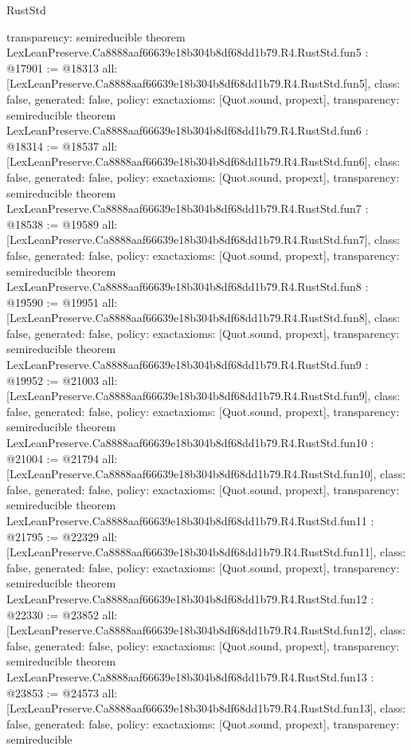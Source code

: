 \begin{lexlean}{RustStd}
\begin{coremodule}
{  transparency: semireducible
}
theorem LexLeanPreserve.Ca8888aaf66639e18b304b8df68dd1b79.R4.RustStd.fun5 : @17901 := @18313 {
  all: [LexLeanPreserve.Ca8888aaf66639e18b304b8df68dd1b79.R4.RustStd.fun5],
  class: false,
  generated: false,
  policy: exact{axioms: [Quot.sound, propext]},
  transparency: semireducible
}
theorem LexLeanPreserve.Ca8888aaf66639e18b304b8df68dd1b79.R4.RustStd.fun6 : @18314 := @18537 {
  all: [LexLeanPreserve.Ca8888aaf66639e18b304b8df68dd1b79.R4.RustStd.fun6],
  class: false,
  generated: false,
  policy: exact{axioms: [Quot.sound, propext]},
  transparency: semireducible
}
theorem LexLeanPreserve.Ca8888aaf66639e18b304b8df68dd1b79.R4.RustStd.fun7 : @18538 := @19589 {
  all: [LexLeanPreserve.Ca8888aaf66639e18b304b8df68dd1b79.R4.RustStd.fun7],
  class: false,
  generated: false,
  policy: exact{axioms: [Quot.sound, propext]},
  transparency: semireducible
}
theorem LexLeanPreserve.Ca8888aaf66639e18b304b8df68dd1b79.R4.RustStd.fun8 : @19590 := @19951 {
  all: [LexLeanPreserve.Ca8888aaf66639e18b304b8df68dd1b79.R4.RustStd.fun8],
  class: false,
  generated: false,
  policy: exact{axioms: [Quot.sound, propext]},
  transparency: semireducible
}
theorem LexLeanPreserve.Ca8888aaf66639e18b304b8df68dd1b79.R4.RustStd.fun9 : @19952 := @21003 {
  all: [LexLeanPreserve.Ca8888aaf66639e18b304b8df68dd1b79.R4.RustStd.fun9],
  class: false,
  generated: false,
  policy: exact{axioms: [Quot.sound, propext]},
  transparency: semireducible
}
theorem LexLeanPreserve.Ca8888aaf66639e18b304b8df68dd1b79.R4.RustStd.fun10 : @21004 := @21794 {
  all: [LexLeanPreserve.Ca8888aaf66639e18b304b8df68dd1b79.R4.RustStd.fun10],
  class: false,
  generated: false,
  policy: exact{axioms: [Quot.sound, propext]},
  transparency: semireducible
}
theorem LexLeanPreserve.Ca8888aaf66639e18b304b8df68dd1b79.R4.RustStd.fun11 : @21795 := @22329 {
  all: [LexLeanPreserve.Ca8888aaf66639e18b304b8df68dd1b79.R4.RustStd.fun11],
  class: false,
  generated: false,
  policy: exact{axioms: [Quot.sound, propext]},
  transparency: semireducible
}
theorem LexLeanPreserve.Ca8888aaf66639e18b304b8df68dd1b79.R4.RustStd.fun12 : @22330 := @23852 {
  all: [LexLeanPreserve.Ca8888aaf66639e18b304b8df68dd1b79.R4.RustStd.fun12],
  class: false,
  generated: false,
  policy: exact{axioms: [Quot.sound, propext]},
  transparency: semireducible
}
theorem LexLeanPreserve.Ca8888aaf66639e18b304b8df68dd1b79.R4.RustStd.fun13 : @23853 := @24573 {
  all: [LexLeanPreserve.Ca8888aaf66639e18b304b8df68dd1b79.R4.RustStd.fun13],
  class: false,
  generated: false,
  policy: exact{axioms: [Quot.sound, propext]},
  transparency: semireducible
}
\end{coremodule}
\end{lexlean}

